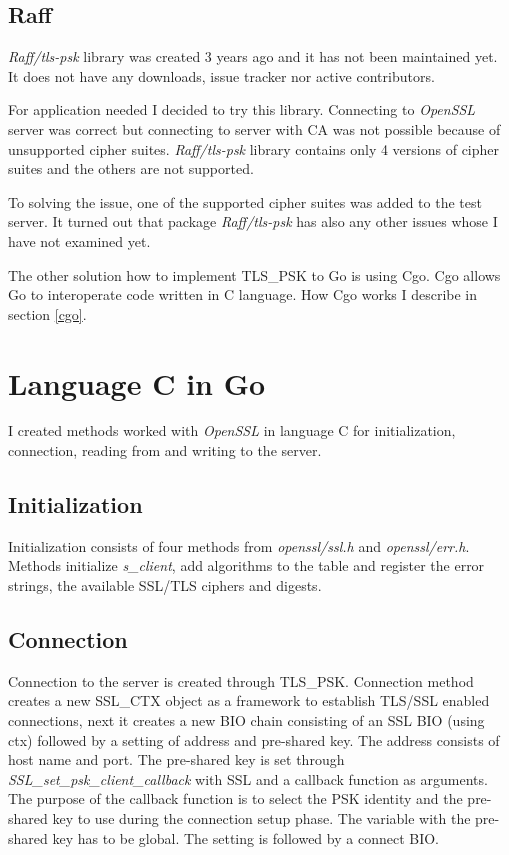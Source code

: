 \documentclass[
  digital, %
  notable,   %
  lof,     %
  lot,     %
]{fithesis3}
\begin{document}
\subsection{Raff}\label{raff}
\textit{Raff/tls-psk} library was created 3 years ago and it has not been 
maintained yet. It does not have any downloads, issue tracker nor active contributors. 

For application needed I decided to try this library. Connecting to \textit{OpenSSL} server was 
correct but connecting to server with CA was not possible because of unsupported cipher 
suites. \textit{Raff/tls-psk} library contains only 4 versions of cipher suites and the others 
are not supported. 

To solving the issue, one of the supported cipher suites was added to the test server. It turned 
out that package \textit{Raff/tls-psk} has also any other issues whose I have not examined yet.

The other solution how to implement TLS\_PSK to Go is using Cgo. Cgo allows Go to 
interoperate code written in C language. How Cgo works I describe in section \ref{cgo}. 


\section{Language C in Go}\label{langCinGo}
I created methods worked with \textit{OpenSSL} in language C for initialization, connection, 
reading from and writing to the server.

\subsection{Initialization}
Initialization consists of four methods from \textit{openssl/ssl.h} and \textit{openssl/err.h}. 
Methods initialize \textit{s\_client}, add algorithms to the table and register the error strings, 
the available SSL/TLS ciphers and digests.

\subsection{Connection}\label{conn}
Connection to the server is created through TLS\_PSK. Connection method creates a new SSL\_CTX 
object as a framework to establish TLS/SSL enabled connections, next it creates a new BIO chain 
consisting of an SSL BIO (using ctx) followed by a setting of address and pre-shared key. The 
address consists of host name and port. The pre-shared key is set through 
\textit{SSL\_set\_psk\_client\_callback} with SSL and a callback function as arguments. The 
purpose of the callback function is to select the PSK identity and the pre-shared key to use 
during the connection setup phase. The variable with the pre-shared key has to be global. The 
setting is followed by a connect BIO.
\end{document}
